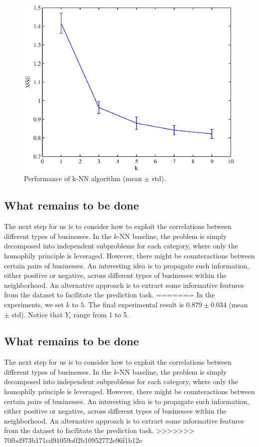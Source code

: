 \begin{figure}[t]
\centering
    \begin{minipage}[l]{\columnwidth}
      \centering
      \includegraphics[width=1\textwidth]{knn}
    \end{minipage}
  \caption{Performance of k-NN algorithm (mean $\pm$ std).}\label{knn}
\end{figure}

\subsection{What remains to be done}

The next step for us is to consider how to exploit the correlations between different types of businesses. In the $k$-NN baseline, the problem is simply decomposed into independent subproblems for each category, where only the homophily principle is leveraged. However, there might be counteractions between certain pairs of businesses. An interesting idea is to propagate such information, either positive or negative, across different types of businesses within the neighborhood. An alternative approach is to extract some informative features from the dataset to facilitate the prediction task.
=======
In the experiments, we set $k$ to $5$. The final experimental result is $0.879 \pm 0.034$ (mean $\pm$ std).
Notice that $Y_i$ range from 1 to 5.

\subsection{What remains to be done}

The next step for us is to consider how to exploit the correlations between different types of businesses. In the $k$-NN baseline, the problem is simply decomposed into independent subproblems for each category, where only the homophily principle is leveraged. However, there might be counteractions between certain pairs of businesses. An interesting idea is to propagate such information, either positive or negative, across different types of businesses within the neighborhood. An alternative approach is to extract some informative features from the dataset to facilitate the prediction task. 
>>>>>>> 70fbd973b171cd91059a02b10952772e96f1b12e
